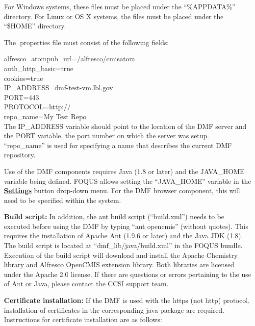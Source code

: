 For Windows systems, these files must be placed under the ``\%APPDATA\%'' directory.
For Linux or OS X systems, the files must be placed under the ``\$HOME'' directory.

The .properties file must consist of the following fields:

alfresco\_atompub\_url=/alfresco/cmisatom\\
auth\_http\_basic=true\\
cookies=true\\
IP\_ADDRESS=dmf-test-vm.lbl.gov\\
PORT=443\\
PROTOCOL=http://\\
repo\_name=My Test Repo\\

The IP\_ADDRESS variable should
point to the location of the DMF server and the PORT variable, the port number on which
the server was setup. ``repo\_name'' is used for specifying a name that describes the
current DMF repository.

Use of the DMF components requires Java (1.8 or later) and the JAVA\_HOME variable being defined.
FOQUS allows setting the ``JAVA\_HOME'' variable in the \textbf{\underline{Settings}} button drop-down menu.
For the DMF browser component, this will need to be specified within the system.

\textbf{Build script:} In addition, the ant build script (``build.xml'') needs to be executed before using the DMF by typing ``ant opencmis'' (without quotes).
This requires the installation of Apache Ant (1.9.6 or later) and the Java JDK (1.8).
The build script is located
at ``dmf\_lib/java/build.xml'' in the FOQUS bundle. Execution of the build script will download and install the
Apache Chemistry library and Alfresco OpenCMIS extension library.
Both libraries are licensed under the Apache 2.0 license.
If there are questions or errors pertaining to the use of Ant or Java, please contact the CCSI support team.

\textbf{Certificate installation:} If the DMF is used with the https (not http) protocol,
installation of certificates in the corresponding java package are
required. Instructions for certificate installation are as follows:

